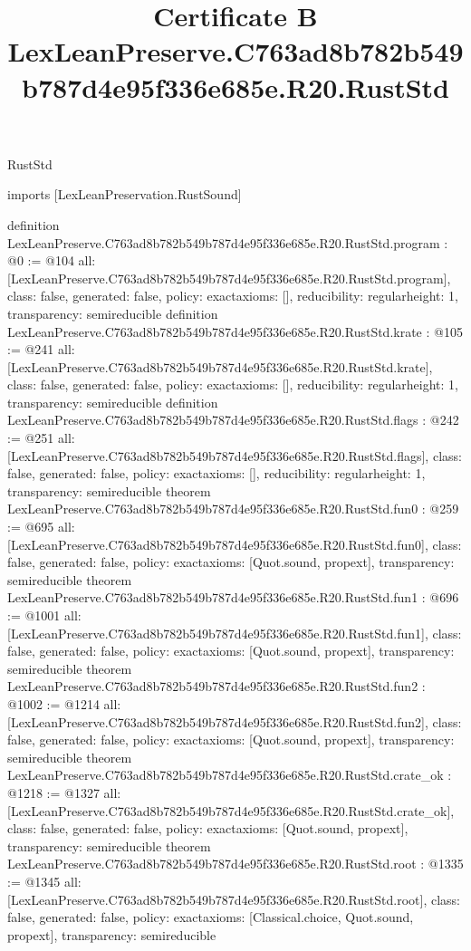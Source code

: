 \begin{lexlean}{RustStd}
\title{Certificate B LexLeanPreserve.C763ad8b782b549b787d4e95f336e685e.R20.RustStd}
\begin{coremodule}
imports [LexLeanPreservation.RustSound]

definition LexLeanPreserve.C763ad8b782b549b787d4e95f336e685e.R20.RustStd.program : @0 := @104 {
  all: [LexLeanPreserve.C763ad8b782b549b787d4e95f336e685e.R20.RustStd.program],
  class: false,
  generated: false,
  policy: exact{axioms: []},
  reducibility: regular{height: 1},
  transparency: semireducible
}
definition LexLeanPreserve.C763ad8b782b549b787d4e95f336e685e.R20.RustStd.krate : @105 := @241 {
  all: [LexLeanPreserve.C763ad8b782b549b787d4e95f336e685e.R20.RustStd.krate],
  class: false,
  generated: false,
  policy: exact{axioms: []},
  reducibility: regular{height: 1},
  transparency: semireducible
}
definition LexLeanPreserve.C763ad8b782b549b787d4e95f336e685e.R20.RustStd.flags : @242 := @251 {
  all: [LexLeanPreserve.C763ad8b782b549b787d4e95f336e685e.R20.RustStd.flags],
  class: false,
  generated: false,
  policy: exact{axioms: []},
  reducibility: regular{height: 1},
  transparency: semireducible
}
theorem LexLeanPreserve.C763ad8b782b549b787d4e95f336e685e.R20.RustStd.fun0 : @259 := @695 {
  all: [LexLeanPreserve.C763ad8b782b549b787d4e95f336e685e.R20.RustStd.fun0],
  class: false,
  generated: false,
  policy: exact{axioms: [Quot.sound, propext]},
  transparency: semireducible
}
theorem LexLeanPreserve.C763ad8b782b549b787d4e95f336e685e.R20.RustStd.fun1 : @696 := @1001 {
  all: [LexLeanPreserve.C763ad8b782b549b787d4e95f336e685e.R20.RustStd.fun1],
  class: false,
  generated: false,
  policy: exact{axioms: [Quot.sound, propext]},
  transparency: semireducible
}
theorem LexLeanPreserve.C763ad8b782b549b787d4e95f336e685e.R20.RustStd.fun2 : @1002 := @1214 {
  all: [LexLeanPreserve.C763ad8b782b549b787d4e95f336e685e.R20.RustStd.fun2],
  class: false,
  generated: false,
  policy: exact{axioms: [Quot.sound, propext]},
  transparency: semireducible
}
theorem LexLeanPreserve.C763ad8b782b549b787d4e95f336e685e.R20.RustStd.crate_ok : @1218 := @1327 {
  all: [LexLeanPreserve.C763ad8b782b549b787d4e95f336e685e.R20.RustStd.crate_ok],
  class: false,
  generated: false,
  policy: exact{axioms: [Quot.sound, propext]},
  transparency: semireducible
}
theorem LexLeanPreserve.C763ad8b782b549b787d4e95f336e685e.R20.RustStd.root : @1335 := @1345 {
  all: [LexLeanPreserve.C763ad8b782b549b787d4e95f336e685e.R20.RustStd.root],
  class: false,
  generated: false,
  policy: exact{axioms: [Classical.choice, Quot.sound, propext]},
  transparency: semireducible
}


\end{coremodule}
\end{lexlean}
